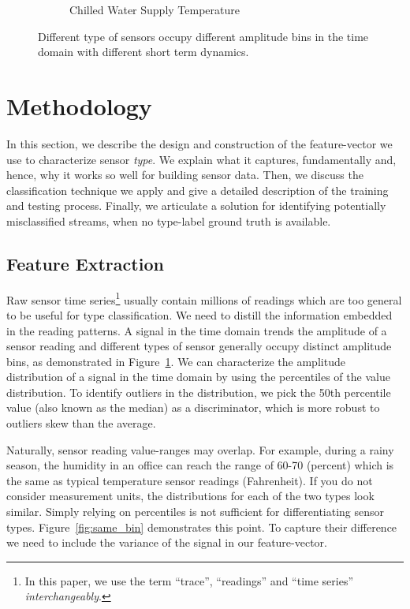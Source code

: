 \begin{figure}[ht!]
\begin{subfigure}{0.32\textwidth}
                \caption{Chilled Water Supply Temperature}
  \end{subfigure}
\caption{Different type of sensors occupy different amplitude bins in the time domain with different short term dynamics.}
\label{fig:example}
\end{figure}

\section{Methodology}
In this section, we describe the design and construction of the feature-vector we use to characterize sensor \emph{type}.  We
explain what it captures, fundamentally and, hence, why it works so well for building sensor data. Then, we discuss
the classification technique we apply and give a detailed description of the training and testing process. Finally, we articulate
a solution for identifying potentially misclassified streams, when no type-label ground truth is available.

\subsection{Feature Extraction}
Raw sensor time series\footnote{In this paper, we use the term ``trace'', ``readings'' and ``time series'' \textit{interchangeably}.} usually contain millions of readings which are too general to be useful for type classification.   We need to distill the information embedded in the reading patterns.
A signal in the time domain trends the amplitude of a sensor reading and different types of sensor generally occupy distinct
amplitude bins, as demonstrated in Figure~\ref{fig:example}. We can characterize the amplitude distribution of a signal in the time
domain by using the percentiles of the value distribution.%
To identify outliers in the distribution, we pick the 50th percentile value (also known as the median) as a discriminator, which
is more robust to outliers skew than the average. 

Naturally, sensor reading value-ranges may overlap. For example, during a rainy season, the humidity in an
office can reach the range of 60-70 (percent) which is the same as typical temperature sensor readings (Fahrenheit).
If you do not consider measurement units, the distributions for each of the two types look similar. 
Simply relying on percentiles is not sufficient for differentiating sensor types. Figure~\ref{fig:same_bin} demonstrates this
point. To capture their difference we need to include the variance of the signal in our feature-vector.

